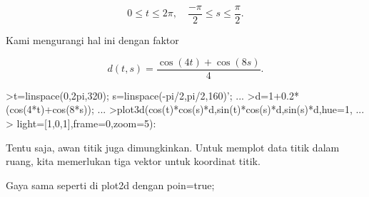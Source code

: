 \documentclass[12pt,Times new roman,letterpaper]{book}
\begin{document}
\begin{eulernootebook}
\begin{eulercomment}
\begin{eulercomment}
\begin{eulernootebook}
\begin{eulercomment}
\begin{eulercomment}
\begin{eulercomment}
\begin{eulercomment}
\begin{eulercomment}
\begin{eulercomment}
\begin{eulercomment}
\begin{eulernotebook}
\begin{eulercomment}
\end{eulercomment}
\begin{eulerformula}
\[
0 \le t \le 2\pi, \quad \frac{-\pi}{2} \le s \le \frac{\pi}{2}.
\]
\end{eulerformula}
\begin{eulercomment}
Kami mengurangi hal ini dengan faktor

\end{eulercomment}
\begin{eulerformula}
\[
d(t,s) = \frac{\cos(4t)+\cos(8s)}{4}.
\]
\end{eulerformula}
\begin{eulerprompt}
>t=linspace(0,2pi,320); s=linspace(-pi/2,pi/2,160)'; ...
>d=1+0.2*(cos(4*t)+cos(8*s)); ...
>plot3d(cos(t)*cos(s)*d,sin(t)*cos(s)*d,sin(s)*d,hue=1, ...
>  light=[1,0,1],frame=0,zoom=5):
\end{eulerprompt}
\begin{eulercomment}
Tentu saja, awan titik juga dimungkinkan. Untuk memplot data titik
dalam ruang, kita memerlukan tiga vektor untuk koordinat titik.

Gaya sama seperti di plot2d dengan poin=true;


\end{eulercomment}
\end{eulernotebook}
\end{eulercomment}
\end{eulercomment}
\end{eulercomment}
\end{eulercomment}
\end{eulercomment}
\end{eulercomment}
\end{eulercomment}
\end{eulernootebook}
\end{eulercomment}
\end{eulercomment}
\end{eulernootebook}
\end{document}
